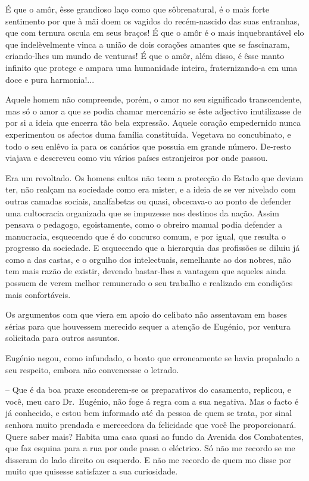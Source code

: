 \documentclass[9pt]{article}
\begin{document}
É que o amôr, êsse grandioso laço como que sôbrenatural, é o mais
forte sentimento por que à mãi doem os vagidos do recém-nascido das
suas entranhas, que com ternura oscula em seus braços! É que o amôr
é o mais inquebrantável elo que indelèvelmente vinca a união de dois
cora\-ções amantes que se fascinaram, criando-\-lhes um mundo de venturas!
É que o amôr, além disso, é êsse manto infinito que protege e ampara
uma humanidade inteira, fraternizando-a em uma doce e pura harmonia!...

Aquele homem não compreende, porém, o amor no seu signifi\-cado transcendente, mas só o amor a que se podia chamar mercenário se êste adjectivo
inutilizasse de por si a ideia que encerra tão bela ex\-pres\-são. Aquele cora\-ção empedernido nunca experimentou os afectos duma fa\-mí\-lia constituída.
Vegetava no concubinato, e todo o seu enlêvo ia para os canários que possuia
em gran\-de número. De-resto viajava e descreveu como viu vários países estranjeiros por onde passou.

Era um revoltado. Os homens cultos não teem a protec\-ção do Estado que
deviam ter, não realçam na sociedade como era mister, e a ideia de se ver nivelado com outras camadas sociais, analfabetas ou quasi, obcecava-o ao ponto
de defender uma cultocracia organizada que se impuzesse nos destinos da
na\-ção. Assim pensava o pedagogo, egoistamente, como o obreiro manual podia
defender a manucracia, esquecendo que é do concurso comum, e por igual, que
resulta o progresso da sociedade. E esquecendo que a hierarquia das
profissões se diluiu já como a das
castas, e o orgu\-lho dos intelectuais,
seme\-lhante ao dos nobres, não tem
mais razão de existir, devendo bastar-\-lhes
a vantagem que aqueles ainda
possuem de verem me\-lhor remunerado
o seu traba\-lho e realizado em condi\-ções mais confortáveis.

Os argumentos com que viera em apoio do celibato não assentavam em
bases sérias para que houvessem merecido sequer a aten\-ção de Eugé\-nio, por
ventura solicitada para outros assuntos.

Eugé\-nio negou, como infundado, o boato que erroneamente se havia propalado a seu respeito, embora não convencesse o letrado.

-- Que é da boa praxe esconderem-se os preparativos do casamento, replicou, e você, meu caro Dr.\ Eugé\-nio, não foge á regra com a sua negativa. Mas
o facto é já conhecido, e estou bem informado até da pessoa de quem se trata,
por sinal senhora muito prendada e merecedora da felicidade que você lhe
proporcionará. Quere saber mais? Habita uma casa quasi ao fundo da Avenida dos Combatentes, que faz esquina para a rua por onde passa o eléctrico.
Só não me recordo se me disseram do lado direito ou esquerdo. E não me recordo de quem mo disse por muito que quisesse satisfazer a sua curiosidade.
\end{document}
